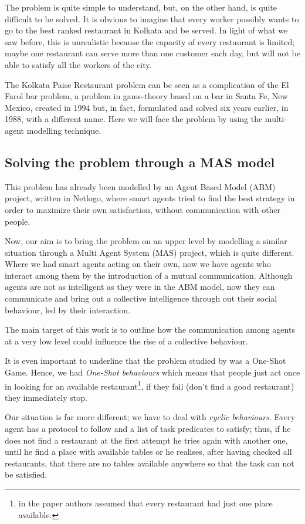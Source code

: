 \documentclass[10pt,a4paper,usenatbib]{article}
\begin{document}
The problem is quite simple to understand, but, on the other hand,
is quite difficult to be solved. It is obvious to imagine that every
worker possibly wants to go to the best ranked restaurant in Kolkata
and be served. In light of what we saw before, this is unrealistic
because the capacity of every restaurant is limited; maybe one restaurant
can serve more than one customer each day, but will not be able to
satisfy all the workers of the city.

The Kolkata Paise Restaurant problem can be seen as a complication
of the El Farol bar problem, a problem in game-theory based on a bar
in Santa Fe, New Mexico, created in 1994 \citep[Arthur, ][]{arthur1994} but, in fact, formulated
and solved six years earlier, in 1988, with a different name. Here we will face the problem by using the multi-agent
modelling technique.


\subsection{Solving the problem through a MAS model}

This problem has already been modelled by an Agent Based Model (ABM)
project, written in Netlogo, where smart agents tried to find the
best strategy in order to maximize their own satisfaction, without
communication with other people. 

Now, our aim is to bring the problem on an upper level by modelling
a similar situation through a Multi Agent System (MAS) project, which
is quite different. Where we had smart agents acting on their own,
now we have agents who interact among them by the introduction of
a mutual communication. Although agents are not as intelligent as
they were in the ABM model, now they can communicate and bring out
a collective intelligence through out their social behaviour, led
by their interaction.

The main target of this work is to outline how the communication among
agents at a very low level could influence the rise of a collective
behaviour.

It is even important to underline that the problem studied by \citet{Chakrabarti2009} was a One-Shot Game. Hence,
we had \emph{One-Shot behaviours} which means that people just act
once in looking for an available restaurant\footnote{in the paper authors assumed that every restaurant had just one place
available.}, if they fail (don't find a good restaurant) they immediately stop. 

Our situation is far more different; we have to deal with \emph{cyclic
behaviours}. Every agent has a protocol to follow and a list of task
predicates to satisfy; thus, if he does not find a restaurant at the
first attempt he tries again with another one, until he find a place
with available tables or he realises, after having checked all restaurants,
that there are no tables available anywhere so that the task can not
be satisfied.
\end{document}
